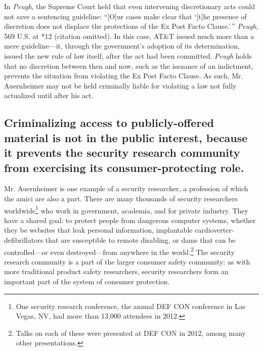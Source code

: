 \documentclass{article}
\begin{document}
	In \emph{Peugh}, the Supreme Court held that even intervening discretionary acts could not save a sentencing guideline: ``[O]ur cases make clear that `[t]he presence of discretion does not displace the protections of the Ex Post Facto Clause.'\,'' \emph{Peugh}, 569 U.S. at *12 (citation omitted). In this case, AT\&T issued much more than a mere guideline---it, through the government's adoption of its determination, issued the new rule of law itself, after the act had been committed. \emph{Peugh} holds that no discretion between then and now, such as the issuance of an indictment, prevents the situation from violating the Ex Post Facto Clause. As such, Mr. Auernheimer may not be held criminally liable for violating a law not fully actualized until after his act.
	
	\subsection{Criminalizing access to publicly-offered material is not in the public interest, because it prevents the security research community from exercising its consumer-protecting role.}
	
	Mr. Auernheimer is one example of a security researcher, a profession of which the amici are also a part. There are many thousands of security researchers worldwide\footnote{One security research conference, the annual DEF CON conference in Las Vegas, NV, had more than 13,000 attendees in 2012.} who work in government, academia, and for private industry. They have a shared goal: to protect people from dangerous computer systems, whether they be websites that leak personal information, implantable cardioverter-defibrillators that are susceptible to remote disabling, or dams that can be controlled---or even destroyed---from anywhere in the world.\footnote{Talks on each of these were presented at DEF CON in 2012, among many other presentations.} The security research community is a part of the larger consumer safety community: as with more traditional product safety researchers, security researchers form an important part of the system of consumer protection.
	
\end{document}
